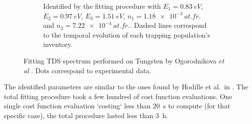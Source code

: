 \begin{figure} [h!]
\begin{subfigure}[t]{0.5\linewidth}
            \caption{Identified by the fitting procedure with $E_1 = \SI{0.83}{eV}$, $E_2 = \SI{0.97}{eV}$, $E_3 = \SI{1.51}{eV}$, $n_1 = \SI{1.18e-3}{at.fr.}$ and \newline $n_2 = \SI{7.22e-4}{at.fr.}$.  Dashed lines correspond to the temporal evolution of each trapping population's inventory.}
            \label{fig:5D TDS}
        \end{subfigure}%
    \caption{Fitting TDS spectrum performed on Tungsten by Ogorodnikova \textit{et  al} \cite{ogorodnikova_deuterium_2003}. Dots correspond to experimental data.}
\end{figure}
The identified parameters are similar to the ones found by Hodille et al.\ in \cite{hodille_macroscopic_2015}.
The total fitting procedure took a few hundred of cost function evaluations.
One single cost function evaluation `costing` less than \SI{20}{s} to compute (for that specific case), the total procedure lasted less than \SI{3}{h}.





